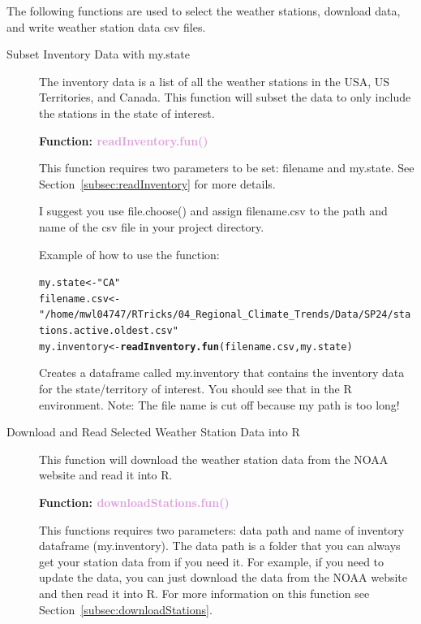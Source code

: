 \documentclass{article}\usepackage[]{graphicx}\usepackage[dvipsnames]{xcolor}
\makeatletter
\newcommand{\hlstr}[1]{\textcolor[rgb]{0.192,0.494,0.8}{#1}}%
\newcommand{\hlstd}[1]{\textcolor[rgb]{0.345,0.345,0.345}{#1}}%
\newcommand{\hlkwb}[1]{\textcolor[rgb]{0.69,0.353,0.396}{#1}}%
\newcommand{\hlkwd}[1]{\textcolor[rgb]{0.737,0.353,0.396}{\textbf{#1}}}%
\newenvironment{kframe}{%
 \def\at@end@of@kframe{}%
 \ifinner\ifhmode%
  \def\at@end@of@kframe{\end{minipage}}%
  \begin{minipage}{\columnwidth}%
 \fi\fi%
 \def\FrameCommand##1{\hskip\@totalleftmargin \hskip-\fboxsep
 \colorbox{shadecolor}{##1}\hskip-\fboxsep
     \hskip-\linewidth \hskip-\@totalleftmargin \hskip\columnwidth}%
 \MakeFramed {\advance\hsize-\width
   \@totalleftmargin\z@ \linewidth\hsize
   \@setminipage}}%
 {\par\unskip\endMakeFramed%
 \at@end@of@kframe}
\newenvironment{knitrout}{}{} %
\makeatother
\begin{document}
The following functions are used to select the weather stations, download data, and write weather station data csv files.

\begin{description}

\item[Subset Inventory Data with my.state]  The inventory data is a list of all the weather stations in the USA, US Territories, and Canada. This function will subset the data to only include the stations in the state of interest.

\begin{center}
\textbf{Function: \textcolor{Plum}{readInventory.fun()}}
\end{center}

This function requires two parameters to be set: filename and my.state. See Section~\ref{subsec:readInventory} for more details.

I suggest you use file.choose() and assign filename.csv to the path and name of the csv file in your project directory.  

Example of how to use the function:

\begin{knitrout}
\color{fgcolor}\begin{kframe}
\begin{alltt}
\hlstd{my.state} \hlkwb{<-} \hlstr{"CA"}
\hlstd{filename.csv} \hlkwb{<-}
  \hlstr{"/home/mwl04747/RTricks/04_Regional_Climate_Trends/Data/SP24/stations.active.oldest.csv"}
\hlstd{my.inventory} \hlkwb{<-} \hlkwd{readInventory.fun}\hlstd{(filename.csv, my.state)}
\end{alltt}
\end{kframe}
\end{knitrout}

Creates a dataframe called my.inventory that contains the inventory data for the state/territory of interest. You should see that in the R environment. Note: The file name is cut off because my path is too long!

\item[Download and Read Selected Weather Station Data into R] This function will download the weather station data from the NOAA website and read it into R.

\begin{center}
\textbf{Function: \textcolor{Plum}{downloadStations.fun()}}
\end{center}

This functions requires two parameters: data path and name of inventory dataframe (my.inventory). The data path is a folder that you can always get your station data from if you need it. For example, if you need to update the data, you can just download the data from the NOAA website and then read it into R. For more information on this function see Section~\ref{subsec:downloadStations}.


\end{description}
\end{document}
